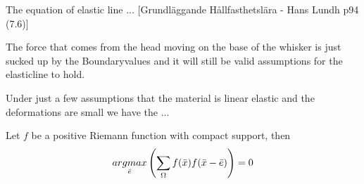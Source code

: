 

The equation of elastic line ... [Grundläggande Hållfasthetslära - Hans Lundh
p94 (7.6)]

The force that comes from the head moving on the base of the whisker is just 
sucked up by the Boundaryvalues and it will still be valid assumptions for the
elasticline to hold.

Under just a few assumptions that the material is linear elastic and the
deformations are small we have the ...



\begin{theorem} %
    \label{thm:response_max}
    Let $f$ be a positive Riemann function with compact support, then
    \begin{equation}
        \underset{\bar{e}}{argmax}
            \left(
            \sum\limits_{\Omega}{f(\bar{x})f(\bar{x}-\bar{e})}
            \right)
            =0
    \end{equation}
\end{theorem}
